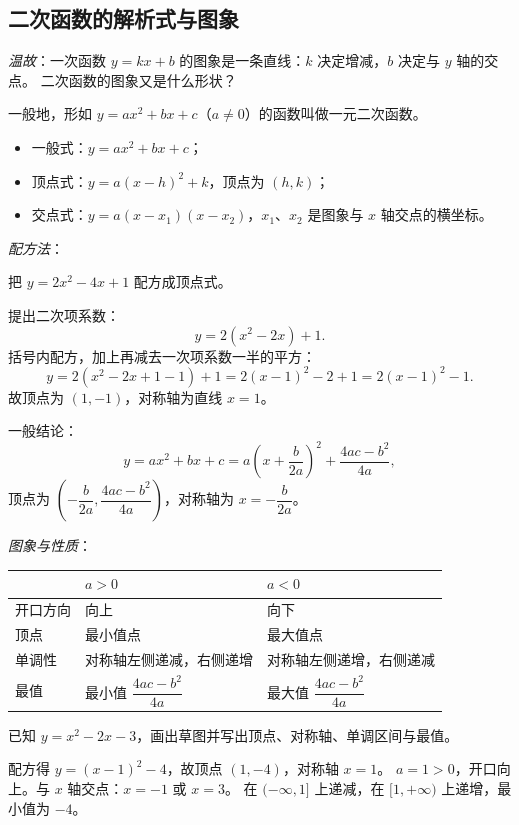 \begin{procedure}

\section{二次函数的解析式与图象}
\textit{温故}：一次函数 $y=kx+b$ 的图象是一条直线：$k$ 决定增减，$b$ 决定与 $y$ 轴的交点。
二次函数的图象又是什么形状？

\begin{definition}
一般地，形如 $y=ax^2+bx+c$（$a\neq0$）的函数叫做一元二次函数。
\end{definition}
\begin{itemize}
  \item 一般式：$y=ax^2+bx+c$；
  \item 顶点式：$y=a(x-h)^2+k$，顶点为 $(h,k)$；
  \item 交点式：$y=a(x-x_1)(x-x_2)$，$x_1$、$x_2$ 是图象与 $x$ 轴交点的横坐标。
\end{itemize}

\textit{配方法}：
\begin{example}
把 $y=2x^2-4x+1$ 配方成顶点式。
\end{example}
\begin{solution}
提出二次项系数：
\[
  y=2(x^2-2x)+1.
\]
括号内配方，加上再减去一次项系数一半的平方：
\[
  y=2(x^2-2x+1-1)+1=2(x-1)^2-2+1=2(x-1)^2-1.
\]
故顶点为 $(1,-1)$，对称轴为直线 $x=1$。
\end{solution}

一般结论：
\[
  y=ax^2+bx+c=a\left(x+\frac{b}{2a}\right)^2+\frac{4ac-b^2}{4a},
\]
顶点为 $\left(-\dfrac{b}{2a},\dfrac{4ac-b^2}{4a}\right)$，对称轴为 $x=-\dfrac{b}{2a}$。

\textit{图象与性质}：
\begin{center}
\footnotesize
\setlength{\tabcolsep}{3pt}
\renewcommand{\arraystretch}{1.4}
\begin{tabular}{p{3.0cm}p{4.8cm}p{4.8cm}}
\toprule
 & $a>0$ & $a<0$ \\
\midrule
开口方向 & 向上 & 向下 \\
顶点 & 最小值点 & 最大值点 \\
单调性 & 对称轴左侧递减，右侧递增 & 对称轴左侧递增，右侧递减 \\
最值 & 最小值 $\dfrac{4ac-b^2}{4a}$ & 最大值 $\dfrac{4ac-b^2}{4a}$ \\
\bottomrule
\end{tabular}
\end{center}

\begin{example}
已知 $y=x^2-2x-3$，画出草图并写出顶点、对称轴、单调区间与最值。
\end{example}
\begin{solution}
配方得 $y=(x-1)^2-4$，故顶点 $(1,-4)$，对称轴 $x=1$。
$a=1>0$，开口向上。与 $x$ 轴交点：$x=-1$ 或 $x=3$。
在 $(-\infty,1]$ 上递减，在 $[1,+\infty)$ 上递增，最小值为 $-4$。
\end{solution}


\end{procedure}
